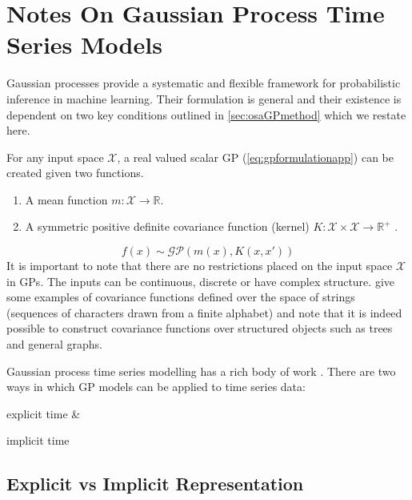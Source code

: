 \chapter{Notes On Gaussian Process Time Series Models}\label{app:gpNARX}

Gaussian processes provide a systematic and flexible framework for probabilistic inference in machine learning. 
Their formulation is general and their existence is dependent on two key conditions outlined in \cref{sec:osaGPmethod} 
which we restate here.

For any input space $\mathcal{X}$, a real valued scalar GP (\cref{eq:gpformulationapp}) can be created given two functions.
%
\begin{enumerate}
    \item A mean function $m: \mathcal{X} \longrightarrow \mathbb{R}$.
    \item A symmetric positive definite covariance function (kernel) 
    $K: \mathcal{X} \times \mathcal{X} \longrightarrow \mathbb{R}^{+}$ \citep[ch.~1\&2]{Berlinet2004}.
\end{enumerate}    
%
\begin{equation}\label{eq:gpformulationapp}
    f(x) \sim \mathcal{GP}(m(x), K(x, x'))
\end{equation}
%
It is important to note that there are no restrictions placed on the input space $\mathcal{X}$ in GPs. The inputs 
can be continuous, discrete or have complex structure. \citet[ch.~4, sec.~4.4]{Rasmussen:2005:GPM:1162254} give 
some examples of covariance functions defined over the space of strings (sequences of characters drawn from a 
finite alphabet) and note that it is indeed possible to construct covariance functions over structured objects 
such as trees and general graphs. 

Gaussian process time series modelling has a rich body of work \citep{turner2012gaussian,frigola2016bayesian}. There 
are two ways in which GP models can be applied to time series data: \begin{enumerate*} \item explicit time \& \item implicit time \end{enumerate*}

\section*{Explicit vs Implicit Representation}

